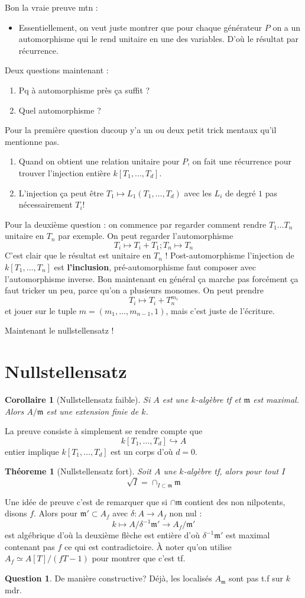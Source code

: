 \documentclass[a4paper,12pt]{book}
\newcommand{\m}{\mathfrak{m}}
\theoremstyle{plain}
\newtheorem{thm}[subsection]{Théoreme}
\newtheorem{cor}[subsection]{Corollaire}
\theoremstyle{definition}
\newtheorem{quest}{Question}
\theoremstyle{remark}
\begin{document}
Bon la vraie preuve mtn :
\begin{itemize}
    \item Essentiellement, on veut juste montrer que pour chaque
	générateur $P$ on a un automorphisme qui le rend unitaire en
	une des variables. D'où le résultat par récurrence.
\end{itemize}
Deux questions maintenant :
\begin{enumerate}
    \item Pq à automorphisme près ça suffit ?
    \item Quel automorphisme ?
\end{enumerate}
Pour la première question ducoup y'a un ou deux petit trick mentaux
qu'il mentionne pas.
\begin{enumerate}
    \item Quand on obtient une relation unitaire pour $P$, on fait une 
	récurrence pour trouver l'injection entière $k[T_1,\ldots,T_d]$.
    \item L'injection ça peut être $T_1\mapsto L_1(T_1,\ldots, T_d)$
	avec les $L_i$ de degré $1$ pas nécessairement $T_i$!
\end{enumerate}
Pour la deuxième question : on commence par regarder comment rendre
$T_1\ldots T_n$ unitaire en $T_n$ par exemple. On peut regarder
l'automorphisme 
\[T_i\mapsto T_i+T_1;T_n\mapsto T_n\]
C'est clair que le résultat est unitaire en $T_n$ ! Post-automorphisme
l'injection de $k[T_1,\ldots,T_n]$ est \textbf{l'inclusion}, 
pré-automorphisme faut composer avec l'automorphisme inverse. Bon
maintenant en général ça marche pas forcément ça faut tricker un peu,
parce qu'on a plusieurs monomes.
On peut prendre
\[T_i\mapsto T_i+T_n^{m_i}\]
et jouer sur le tuple $m=(m_1,\ldots,m_{n-1},1)$, mais c'est juste
de l'écriture.

Maintenant le nullstellensatz ! 
\section{Nullstellensatz}
\begin{cor}[Nullstellensatz faible]
    Si $A$ est une $k$-algèbre tf et $\m$ est maximal. Alors 
    $A/\m$ est une extension finie de $k$.
\end{cor}
La preuve consiste à simplement se rendre compte que 
\[k[T_1,\ldots,T_d]\hookrightarrow A\]
entier implique $k[T_1,\ldots, T_d]$ est un corps d'où $d=0$.
\begin{thm}[Nullstellensatz fort]
    Soit $A$ une $k$-algèbre tf, alors pour tout $I$
    \[\sqrt I =\cap_{I\subset \m}\m\]
\end{thm}
Une idée de preuve c'est de remarquer que si $\cap \m$ contient des
non nilpotents, disons $f$. Alors pour $\m'\subset A_f$ avec 
$\delta\colon A\to A_f$ non nul :
\[k\mapsto A/\delta^{-1}\m'\to A_f/\m'\]
est algébrique d'où la deuxième flèche est entière d'où $\delta^{-1}\m'$
est maximal contenant pas $f$ ce qui est contradictoire. À noter
qu'on utilise $A_f\simeq A[T]/(fT-1)$ pour montrer que c'est tf.
\begin{quest}
    De manière constructive? Déjà, les localisés $A_\m$ sont pas t.f sur
    $k$ mdr.
\end{quest}
\end{document}
